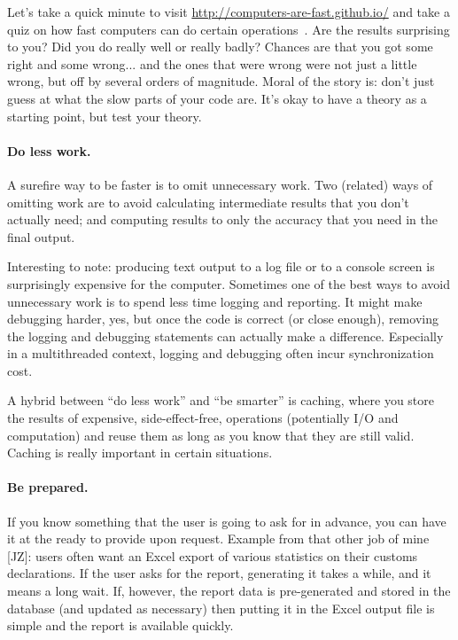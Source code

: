 \documentclass[a4paper]{report}
\begin{document}
Let's take a quick minute to visit \url{http://computers-are-fast.github.io/} and take a quiz on how fast computers can do certain operations~\cite{cafgithub}. Are the results surprising to you? Did you do really well or really badly? Chances are that you got some right and some wrong... and the ones that were wrong were not just a little wrong, but off by several orders of magnitude. Moral of the story is: don't just guess at what the slow parts of your code are. It's okay to have a theory as a starting point, but test your theory.


\paragraph{Do less work.} A surefire way to be faster is to omit unnecessary
work. Two (related) ways of omitting work are to avoid calculating
intermediate results that you don't actually need; and computing
results to only the accuracy that you need in the final output.

Interesting to note: producing text output to a log file or to a console screen is surprisingly expensive for the computer. Sometimes one of the best ways to avoid unnecessary work is to spend less time logging and reporting. It might make debugging harder, yes, but once the code is correct (or close enough), removing the logging and debugging statements can actually make a difference. Especially in a multithreaded context, logging and debugging often incur synchronization cost.

A hybrid between ``do less work'' and ``be smarter'' is caching, where
you store the results of expensive, side-effect-free, operations
(potentially I/O and computation) and reuse them as long as you
know that they are still valid. Caching is really important in certain situations.

\paragraph{Be prepared.} If you know something that the user is going to ask for in advance, you can have it at the ready to provide upon request. Example from that other job of mine [JZ]: users often want an Excel export of various statistics on their customs declarations. If the user asks for the report, generating it takes a while, and it means a long wait. If, however, the report data is pre-generated and stored in the database (and updated as necessary) then putting it in the Excel output file is simple and the report is available quickly.
\end{document}
